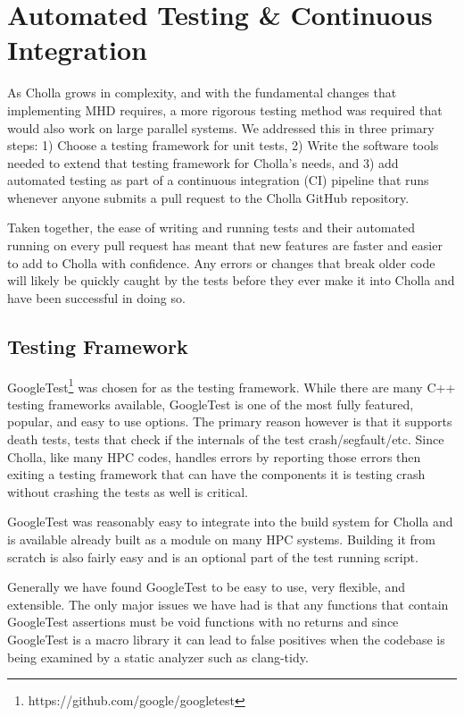 \section{Automated Testing \& Continuous Integration}
\label{sec:testing}

As Cholla grows in complexity, and with the fundamental changes that implementing MHD requires, a more rigorous testing method was required  that would also work on large parallel systems. We addressed this in three primary steps: 1) Choose a testing framework for unit tests, 2) Write the software tools needed to extend that testing framework for Cholla's needs, and 3) add automated testing as part of a continuous integration (CI) pipeline that runs whenever anyone submits a pull request to the Cholla GitHub repository. 

Taken together, the ease of writing and running tests and their automated running on every pull request has meant that new features are faster and easier to add to Cholla with confidence. Any errors or changes that break older code will likely be quickly caught by the tests before they ever make it into Cholla and have been successful in doing so.

\subsection{Testing Framework}
\label{sec:testing-framework}

GoogleTest\footnote{https://github.com/google/googletest} was chosen for as the testing framework. While there are many C++ testing frameworks available, GoogleTest is one of the most fully featured, popular, and easy to use options. The primary reason however is that it supports death tests, tests that check if the internals of the test crash/segfault/etc. Since Cholla, like many HPC codes, handles errors by reporting those errors then exiting a testing framework that can have the components it is testing crash without crashing the tests as well is critical.

GoogleTest was reasonably easy to integrate into the build system for Cholla and is available already built as a module on many HPC systems. Building it from scratch is also fairly easy and is an optional part of the test running script.

Generally we have found GoogleTest to be easy to use, very flexible, and extensible. The only major issues we have had is that any functions that contain GoogleTest assertions must be void functions with no returns and since GoogleTest is a macro library it can lead to false positives when the codebase is being examined by a static analyzer such as clang-tidy.

